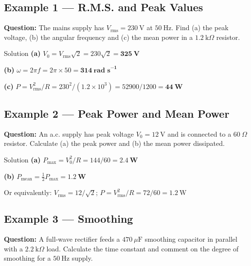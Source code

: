 \subsection*{Example 1 — R.M.S. and Peak Values}

\textbf{Question:} The mains supply has $V_{\text{rms}} = 230\ \text{V}$ at $50\ \text{Hz}$. Find (a) the peak voltage, (b) the angular frequency and (c) the mean power in a $1.2\ \text{k}\Omega$ resistor.

\begin{examplebox}{Solution}
\textbf{(a)} \quad $V_0 = V_{\text{rms}}\sqrt{2} = 230\sqrt{2} = \mathbf{325\ \text{V}}$

\vspace{0.3em}
\textbf{(b)} \quad $\omega = 2\pi f = 2\pi\times50 = \mathbf{314\ \text{rad s}^{-1}}$

\vspace{0.3em}
\textbf{(c)} \quad $P = V_{\text{rms}}^2/R = 230^2/(1.2\times10^3) = 52900/1200 = \mathbf{44\ \text{W}}$
\end{examplebox}

\subsection*{Example 2 — Peak Power and Mean Power}

\textbf{Question:} An a.c. supply has peak voltage $V_0 = 12\ \text{V}$ and is connected to a $60\ \Omega$ resistor. Calculate (a) the peak power and (b) the mean power dissipated.

\begin{examplebox}{Solution}
\textbf{(a)} \quad $P_{\text{max}} = V_0^2/R = 144/60 = \mathbf{2.4\ \text{W}}$

\vspace{0.3em}
\textbf{(b)} \quad $P_{\text{mean}} = \tfrac{1}{2}P_{\text{max}} = \mathbf{1.2\ \text{W}}$

\vspace{0.3em}
Or equivalently: $V_{\text{rms}} = 12/\sqrt{2}$; $P = V_{\text{rms}}^2/R = 72/60 = 1.2\ \text{W}$
\end{examplebox}

\subsection*{Example 3 — Smoothing}

\textbf{Question:} A full-wave rectifier feeds a $470\ \mu\text{F}$ smoothing capacitor in parallel with a $2.2\ \text{k}\Omega$ load. Calculate the time constant and comment on the degree of smoothing for a $50\ \text{Hz}$ supply.

